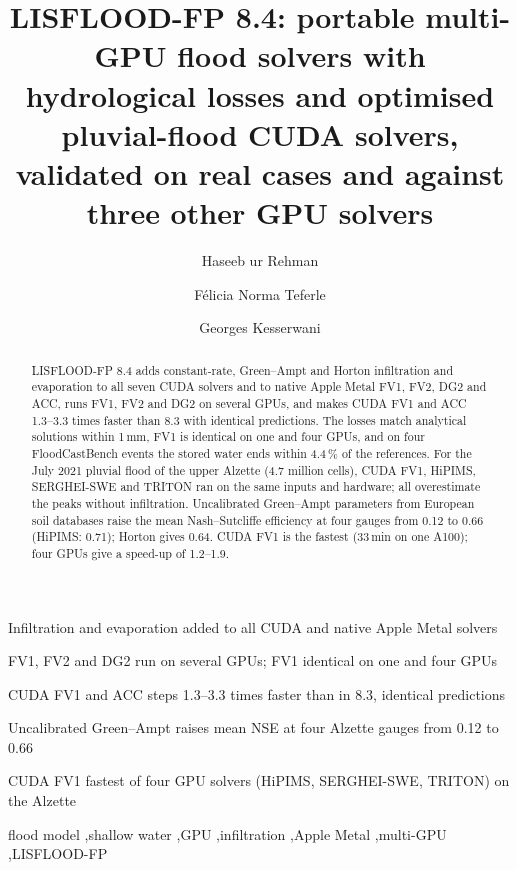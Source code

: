 \documentclass[preprint,12pt,authoryear]{elsarticle}
\begin{document}
\begin{frontmatter}

\title{LISFLOOD-FP 8.4: portable multi-GPU flood solvers with hydrological losses and optimised pluvial-flood CUDA solvers, validated on real cases and against three other GPU solvers}

\author[lux]{Haseeb ur Rehman}
\author[lux]{F\'{e}licia Norma Teferle}
\author[shef]{Georges Kesserwani}

\begin{abstract}
LISFLOOD-FP 8.4 adds constant-rate, Green--Ampt and Horton infiltration and
evaporation to all seven CUDA solvers and to native Apple Metal FV1, FV2, DG2
and ACC, runs FV1, FV2 and DG2 on several GPUs, and makes CUDA FV1 and ACC
1.3--3.3 times faster than 8.3 with identical predictions. The losses match
analytical solutions within 1\,mm, FV1 is identical on one and four GPUs, and
on four FloodCastBench events the stored water ends within 4.4\,\% of the
references. For the July 2021 pluvial flood of the upper Alzette (4.7 million
cells), CUDA FV1, HiPIMS, SERGHEI-SWE and TRITON ran on the same inputs and
hardware; all overestimate the peaks without infiltration. Uncalibrated
Green--Ampt parameters from European soil databases raise the mean
Nash--Sutcliffe efficiency at four gauges from 0.12 to 0.66 (HiPIMS: 0.71);
Horton gives 0.64. CUDA FV1 is the fastest (33\,min on one A100); four GPUs
give a speed-up of 1.2--1.9.
\end{abstract}

\begin{highlights}
\item Infiltration and evaporation added to all CUDA and native Apple Metal solvers
\item FV1, FV2 and DG2 run on several GPUs; FV1 identical on one and four GPUs
\item CUDA FV1 and ACC steps 1.3--3.3 times faster than in 8.3, identical predictions
\item Uncalibrated Green--Ampt raises mean NSE at four Alzette gauges from 0.12 to 0.66
\item CUDA FV1 fastest of four GPU solvers (HiPIMS, SERGHEI-SWE, TRITON) on the Alzette
\end{highlights}

\begin{keyword}
flood model \sep shallow water \sep GPU \sep infiltration \sep Apple Metal \sep multi-GPU \sep LISFLOOD-FP
\end{keyword}

\end{frontmatter}
\linenumbers
\end{document}
